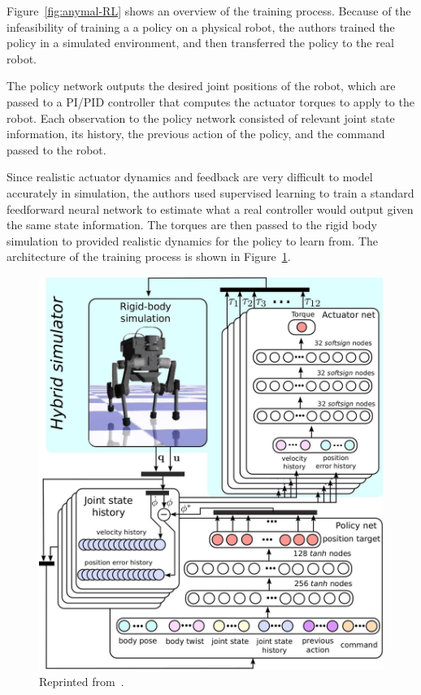 \documentclass[12pt]{report}
\theoremstyle{definition}
\theoremstyle{remark}
\begin{document}
Figure~\ref{fig:anymal-RL} shows an overview of the training process. Because of the infeasibility of training a a policy on a physical robot, the authors trained the policy in a simulated environment, and then transferred the policy to the real robot.

The policy network outputs the desired joint positions of the robot, which are passed to a PI/PID controller that computes the actuator torques to apply to the robot. Each observation to the policy network consisted of relevant joint state information, its history, the previous action of the policy, and the command passed to the robot.

Since realistic actuator dynamics and feedback are very difficult to model accurately in simulation, the authors used supervised learning to train a standard feedforward neural network to estimate what a real controller would output given the same state information. The torques are then passed to the rigid body simulation to provided realistic dynamics for the policy to learn from. The architecture of the training process is shown in Figure~\ref{fig:anymal-detailed}.

\begin{figure}[H]
    \centering
    \includegraphics[width=0.8\linewidth]{figs/anymal_detailed.png}
    \caption{Reprinted from~\cite{hwangbo_learning_2019}.}
    \label{fig:anymal-detailed}
\end{figure}
\end{document}
